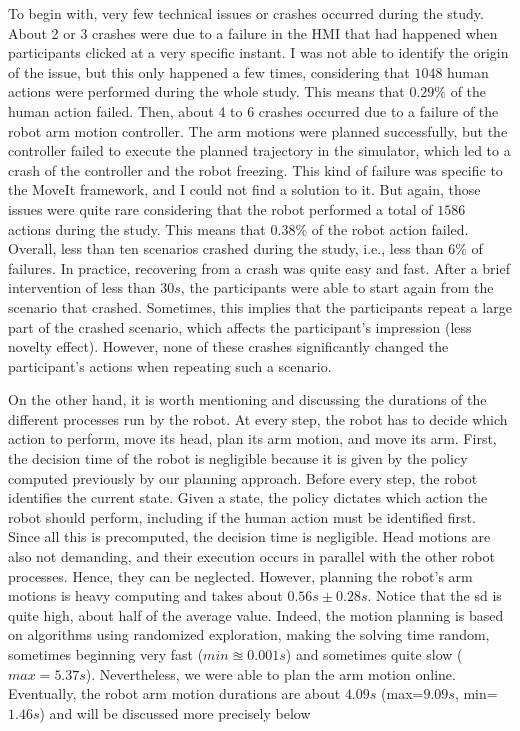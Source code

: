 To begin with, very few technical issues or crashes occurred during the study.
About 2 or 3 crashes were due to a failure in the HMI that had happened when participants clicked at a very specific instant. I was not able to identify the origin of the issue, but this only happened a few times, considering that $1048$ human actions were performed during the whole study. This means that $0.29\%$ of the human action failed. 
Then, about 4 to 6 crashes occurred due to a failure of the robot arm motion controller. The arm motions were planned successfully, but the controller failed to execute the planned trajectory in the simulator, which led to a crash of the controller and the robot freezing. This kind of failure was specific to the MoveIt framework, and I could not find a solution to it. But again, those issues were quite rare considering that the robot performed a total of $1586$ actions during the study. This means that $0.38\%$ of the robot action failed. 
Overall, less than ten scenarios crashed during the study, i.e., less than $6\%$ of failures. 
In practice, recovering from a crash was quite easy and fast. After a brief intervention of less than $30s$, the participants were able to start again from the scenario that crashed. Sometimes, this implies that the participants repeat a large part of the crashed scenario, which affects the participant's impression (less novelty effect). However, none of these crashes significantly changed the participant's actions when repeating such a scenario.


On the other hand, it is worth mentioning and discussing the durations of the different processes run by the robot.
At every step, the robot has to decide which action to perform, move its head, plan its arm motion, and move its arm. First, the decision time of the robot is negligible because it is given by the policy computed previously by our planning approach. Before every step, the robot identifies the current state. Given a state, the policy dictates which action the robot should perform, including if the human action must be identified first. Since all this is precomputed, the decision time is negligible. 
Head motions are also not demanding, and their execution occurs in parallel with the other robot processes. Hence, they can be neglected.
However, planning the robot's arm motions is heavy computing and takes about $0.56s \pm 0.28s$. Notice that the \acrfull{sd} is quite high, about half of the average value. Indeed, the motion planning is based on algorithms using randomized exploration, making the solving time random, sometimes beginning very fast ($min \approxeq 0.001s$) and sometimes quite slow ($max = 5.37s $). Nevertheless, we were able to plan the arm motion online.
Eventually, the robot arm motion durations are about $4.09s$ (max=$9.09s$, min=$1.46s$) and will be discussed more precisely below


